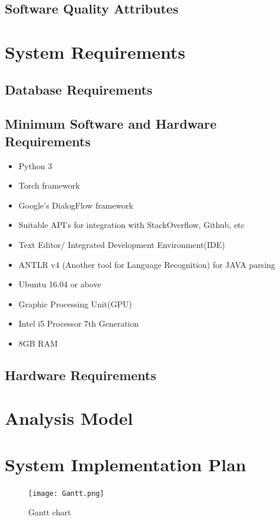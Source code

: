 \documentclass[oneside,a4paper,12pt, times]{book}
\begin{document}
\subsection{Software Quality Attributes}


\section{System  Requirements } 
\subsection{Database Requirements}

\subsection{Minimum Software and Hardware Requirements}
\begin{itemize}
    \item Python 3
    \item Torch framework
    \item Google's DialogFlow framework
    \item Suitable API's for integration with StackOverflow, Github, etc
    \item Text Editor/ Integrated Development Environment(IDE)
    \item ANTLR v4 (Another tool for Language Recognition) for JAVA parsing
    \item Ubuntu 16.04 or above
    \item Graphic Processing Unit(GPU)
    \item Intel i5 Processor 7th Generation
    \item 8GB RAM
\end{itemize}

\subsection{Hardware Requirements}


\section{Analysis Model} 


\section{System Implementation Plan} 
\begin{figure}[h]
    \centering
    \texttt{[image: Gantt.png]}
    \caption{Gantt chart}
    \label{fig:my_label}
\end{figure}
\end{document}
